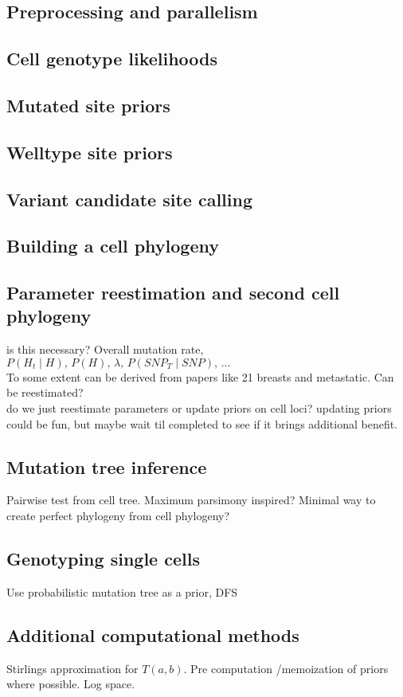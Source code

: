 \documentclass[../main.tex]{subfiles}
\begin{document}
%

\subsection{Preprocessing and parallelism}
%

\subsection{Cell genotype likelihoods}
%

\subsection{Mutated site priors}
%

\subsection{Welltype site priors}
%

\subsection{Variant candidate site calling}
%

\subsection{Building a cell phylogeny}


\subsection{Parameter reestimation and second cell phylogeny}
is this necessary? Overall mutation rate, $P(H_t\mid H),\,P(H),\,\lambda,\,P(SNP_T\mid SNP),\,\dots$\\
To some extent can be derived from papers like 21 breasts and metastatic. Can be reestimated?\\
do we just reestimate parameters or update priors on cell loci? updating priors could be fun, but maybe wait til completed to see if it brings additional benefit.\\

\subsection{Mutation tree inference}
Pairwise test from cell tree. Maximum parsimony inspired? Minimal way to create perfect phylogeny from cell phylogeny?
\subsection{Genotyping single cells}
Use probabilistic mutation tree as a prior, DFS
\subsection{Additional computational methods}
Stirlings approximation for $T(a,b)$. Pre computation /memoization of priors where possible. Log space.
\end{document}
